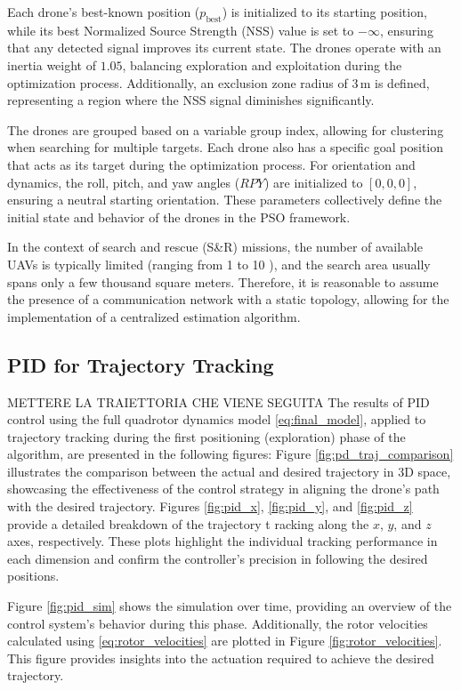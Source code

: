 Each drone's best-known position (\(p_{\text{best}}\)) is initialized 
to its starting position, while its best Normalized Source Strength (NSS) 
value is set to \(-\infty\), ensuring that any detected signal improves 
its current state. The drones operate with an inertia weight of \(1.05\), 
balancing exploration and exploitation during the optimization process. 
Additionally, an exclusion zone radius of \(3 \, \text{m}\) is defined, 
representing a region where the NSS signal diminishes significantly.

The drones are grouped based on a variable group index, allowing for 
clustering when searching for multiple targets. Each drone also has a 
specific goal position that acts as its target during the optimization process. 
For orientation and dynamics, the roll, pitch, and yaw angles (\(RPY\)) 
are initialized to \([0, 0, 0]\), ensuring a neutral starting orientation. 
These parameters collectively define the initial state and behavior of the 
drones in the PSO framework.


In the context of search and rescue (S\&R) missions, the number of available 
UAVs is typically limited (ranging from 1 to 10 \cite{PSO_original}), and 
the search area 
usually spans only a few thousand square meters.
Therefore, it is reasonable to 
assume the presence of a communication network with a static topology, allowing 
for the implementation of a centralized estimation algorithm.

\subsection{PID for Trajectory Tracking}
METTERE LA TRAIETTORIA CHE VIENE SEGUITA
The results of PID control using the full quadrotor dynamics 
model \eqref{eq:final_model},
applied to trajectory tracking during the first positioning 
(exploration) phase of the algorithm, 
are presented in the following figures: 
Figure \ref{fig:pd_traj_comparison} illustrates 
the comparison between the actual and desired trajectory in 3D space, 
showcasing the effectiveness of the control strategy in 
aligning the drone's path with the desired trajectory. 
Figures \ref{fig:pid_x}, \ref{fig:pid_y}, and \ref{fig:pid_z}
provide a detailed breakdown of the trajectory t
racking along the \(x\), \(y\), and \(z\) axes, respectively. 
These plots highlight the individual tracking performance 
in each dimension and confirm the controller's precision 
in following the desired positions.

Figure \ref{fig:pid_sim} shows the simulation over time,
providing an overview of the control system's behavior 
during this phase. Additionally, the rotor velocities 
calculated using \eqref{eq:rotor_velocities} are plotted 
in Figure \ref{fig:rotor_velocities}. This figure provides 
insights into the actuation required to achieve the desired 
trajectory.

